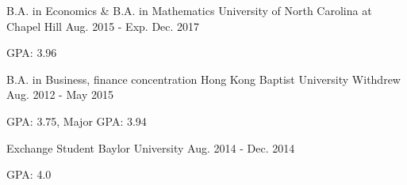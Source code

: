 

\begin{cventries}

  \cventry
    {B.A. in Economics \& B.A. in Mathematics} %
    {University of North Carolina at Chapel Hill} %
    {}
    {Aug. 2015 - Exp. Dec. 2017} %
    {
      \begin{cvitems} %
        \item {GPA: 3.96}
      \end{cvitems}
    }


  \cventry
    {B.A. in Business, finance concentration} %
    {Hong Kong Baptist University} %
    {Withdrew}
    {Aug. 2012 - May 2015} %
    {
      \begin{cvitems} %
        \item {GPA: 3.75, Major GPA: 3.94}
      \end{cvitems}
    }


  \cventry
    {Exchange Student} %
    {Baylor University} %
    {}
    {Aug. 2014 - Dec. 2014} %
    {
      \begin{cvitems} %
        \item {GPA: 4.0}
      \end{cvitems}
    }



\end{cventries}
